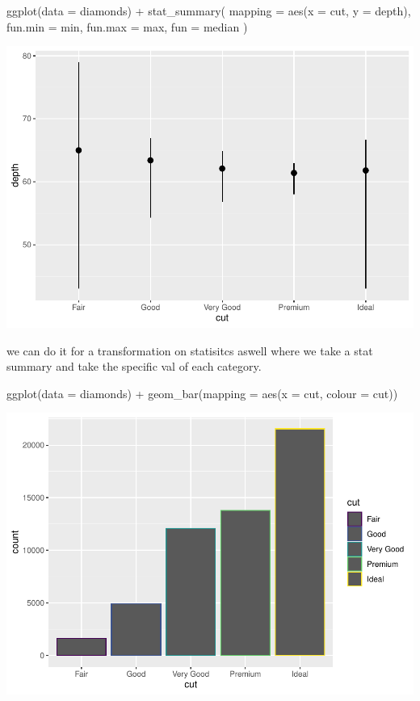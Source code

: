 \documentclass[
]{article}
\newenvironment{Shaded}{\begin{snugshade}}{\end{snugshade}}
\newcommand{\AttributeTok}[1]{\textcolor[rgb]{0.77,0.63,0.00}{#1}}
\newcommand{\FunctionTok}[1]{\textcolor[rgb]{0.00,0.00,0.00}{#1}}
\newcommand{\NormalTok}[1]{#1}
\newcommand{\SpecialCharTok}[1]{\textcolor[rgb]{0.00,0.00,0.00}{#1}}
\begin{document}
\begin{Shaded}
\begin{Highlighting}[]
\FunctionTok{ggplot}\NormalTok{(}\AttributeTok{data =}\NormalTok{ diamonds) }\SpecialCharTok{+} 
  \FunctionTok{stat\_summary}\NormalTok{(}
    \AttributeTok{mapping =} \FunctionTok{aes}\NormalTok{(}\AttributeTok{x =}\NormalTok{ cut, }\AttributeTok{y =}\NormalTok{ depth),}
    \AttributeTok{fun.min =}\NormalTok{ min,}
    \AttributeTok{fun.max =}\NormalTok{ max,}
    \AttributeTok{fun =}\NormalTok{ median}
\NormalTok{  )}
\end{Highlighting}
\end{Shaded}

\includegraphics{Journal_files/figure-latex/unnamed-chunk-47-1.pdf}

we can do it for a transformation on statisitcs aswell where we take a
stat summary and take the specific val of each category.

\begin{Shaded}
\begin{Highlighting}[]
\FunctionTok{ggplot}\NormalTok{(}\AttributeTok{data =}\NormalTok{ diamonds) }\SpecialCharTok{+} 
  \FunctionTok{geom\_bar}\NormalTok{(}\AttributeTok{mapping =} \FunctionTok{aes}\NormalTok{(}\AttributeTok{x =}\NormalTok{ cut, }\AttributeTok{colour =}\NormalTok{ cut))}
\end{Highlighting}
\end{Shaded}

\includegraphics{Journal_files/figure-latex/unnamed-chunk-48-1.pdf}
\end{document}
